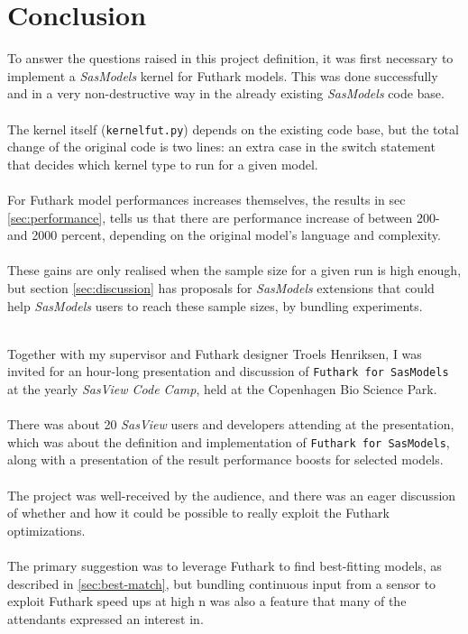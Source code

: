 \documentclass[11pt]{article}
\newcommand{\sasmodels}{\textit{SasModels}}
\newcommand{\sasview}{\textit{SasView}}
\newcommand{\futhark}{\texttt{Futhark for SasModels}}
\begin{document}
\section{Conclusion}
To answer the questions raised in this project definition, it was first
necessary to implement a \sasmodels{} kernel for Futhark models. This was done
successfully and in a very non-destructive way in the already existing
\sasmodels{} code base.
\\\\
The kernel itself (\texttt{kernelfut.py}) depends on the existing code base, but
the total change of the original code is two lines: an extra case in the
switch statement that decides which kernel type to run for a given model.
\\\\
For Futhark model performances increases themselves, the results in
sec \ref{sec:performance}, tells us that there are performance increase of between
200- and 2000 percent, depending on the original model's language and
complexity.
\\\\
These gains are only realised when the sample size for a given run is high
enough, but section \ref{sec:discussion} has proposals for \sasmodels{} extensions
that could help \sasmodels{} users to reach these sample sizes, by bundling
experiments.
\\\\
\begin{mdframed}[
  frametitle={Presentation at \sasview{} Code Camp},
  nobreak=true
  ]
Together with my supervisor and Futhark designer Troels Henriksen,
I was invited for an hour-long presentation and discussion of \futhark{} at the
yearly \textit{SasView Code Camp}, held at the Copenhagen Bio Science Park.\\\\
There was about 20 \sasview{} users and developers attending at the presentation,
which was about the definition and implementation of \futhark{}, along with
a presentation of the result performance boosts for selected models.\\\\
The project was well-received by the audience, and there was an eager discussion
of whether and how it could be possible to really exploit the Futhark
optimizations.\\\\
The primary suggestion was to leverage Futhark to find best-fitting models,
as described in \ref{sec:best-match}, but bundling continuous input from
a sensor to exploit Futhark speed ups at high n was also a feature that many
of the attendants expressed an interest in.
\end{mdframed}
\end{document}
